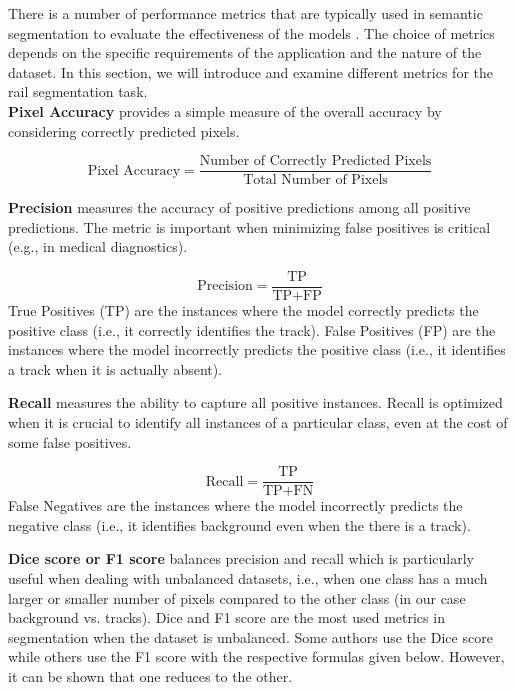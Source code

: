 \documentclass[Master,MDS,english]{BASE/twbook} %
\begin{document}
There is a number of performance metrics that are typically used in semantic segmentation to evaluate the effectiveness of the models \citep{Taha2015}. The choice of metrics depends on the specific requirements of the application and the nature of the dataset. In this section, we will introduce and examine different metrics for the rail segmentation task. \\


\noindent\textbf{Pixel Accuracy} provides a simple measure of the overall accuracy by considering correctly predicted pixels. 


\[
\text{Pixel Accuracy} = \frac{\text{Number of Correctly Predicted Pixels}}{\text{Total Number of Pixels}}
\]

\vspace{1cm}

\noindent\textbf{Precision} measures the accuracy of positive predictions among all positive predictions. The metric is important when minimizing false positives is critical (e.g., in medical diagnostics).

\[
\text{Precision} = \frac{\text{TP}}{\text{TP} + \text{FP}}
\]
True Positives (TP) are the instances where the model correctly predicts the positive class (i.e., it correctly identifies the track).
False Positives (FP) are the instances where the model incorrectly predicts the positive class (i.e., it identifies a track when it is actually absent). \\

\vspace{1cm}

\noindent\textbf{Recall} measures the ability to capture all positive instances. Recall is optimized when it is crucial to identify all instances of a particular class, even at the cost of some false positives.

\[
\text{Recall} = \frac{\text{TP}}{\text{TP} + \text{FN}}
\]
False Negatives are the instances where the model incorrectly predicts the negative class (i.e., it identifies background even when the there is a track). \\

\vspace{1cm}

\noindent\textbf{Dice score or F1 score} balances precision and recall which is particularly useful when dealing with unbalanced datasets, i.e., when one class has a much larger or smaller number of pixels compared to the other class (in our case background vs. tracks). Dice and F1 score are the most used metrics in segmentation when the dataset is unbalanced. Some authors use the Dice score while others use the F1 score with the respective formulas given below. However, it can be shown that one reduces to the other. 
\end{document}
